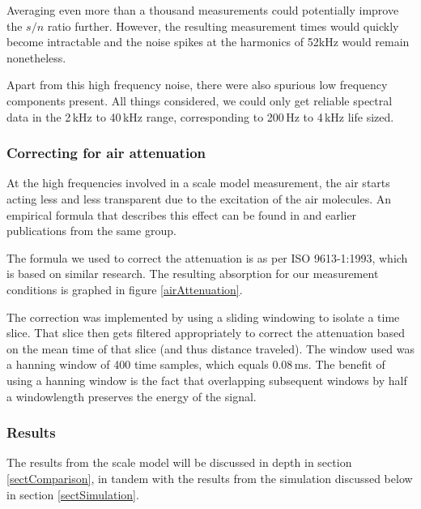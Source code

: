 Averaging even more than a thousand measurements could potentially improve the $s/n$ ratio further. However, the resulting measurement times would quickly become intractable and the noise spikes at the harmonics of 52kHz would remain nonetheless.

Apart from this high frequency noise, there were also spurious low frequency components present.  All things considered, we could only get reliable spectral data in the 2\,kHz to 40\,kHz range, corresponding to 200\,Hz to 4\,kHz life sized.


\subsubsection*{Correcting for air attenuation}
At the high frequencies involved in a scale model measurement, the air starts acting less and less transparent due to the excitation of the air molecules. An empirical formula that describes this effect can be found in \cite{atm-absorption-further-dev} and earlier publications from the same group.

The formula we used to correct the attenuation is as per ISO 9613-1:1993, which is based on similar research. The resulting absorption for our measurement conditions is graphed in figure \ref{airAttenuation}.


The correction was implemented by using a sliding windowing to isolate a time slice. That slice then gets filtered appropriately to correct the attenuation based on the mean time of that slice (and thus distance traveled). The window used was a hanning window of 400 time samples, which equals 0.08\,ms. The benefit of using a hanning window is the fact that overlapping subsequent windows by half a windowlength preserves the energy of the signal.



\subsubsection*{Results}
The results from the scale model will be discussed in depth in section \ref{sectComparison}, in tandem with the results from the simulation discussed below in section \ref{sectSimulation}.


